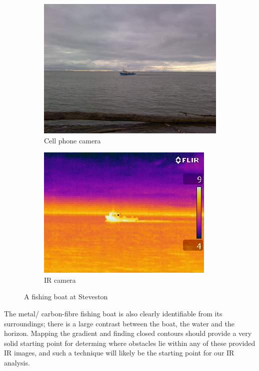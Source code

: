 \begin{figure}
\centering
\begin{subfigure}{.5\textwidth}
  \centering
  \includegraphics[width=.8\linewidth]{"./image/steveston-noon-fishing-visible"}
  \caption{Cell phone camera}
  \label{fig:sub1}
\end{subfigure}%
\begin{subfigure}{.5\textwidth}
  \centering
  \includegraphics[width=.8\linewidth]{"./image/steveston-noon-fishing-ir"}
  \caption{IR camera}
  \label{fig:sub2}
\end{subfigure}
\caption{A fishing boat at Steveston }
\label{fig:IR comparison of a fishing boat in the afternoon}
\end{figure}

The metal/ carbon-fibre fishing boat is also clearly identifiable from its surroundings; there is a large contrast between the boat, the water and the horizon. Mapping the gradient and finding closed contours should provide a very solid starting point for determing where obstacles lie within any of these provided IR images, and such a technique will likely be the starting point for our IR analysis. 

